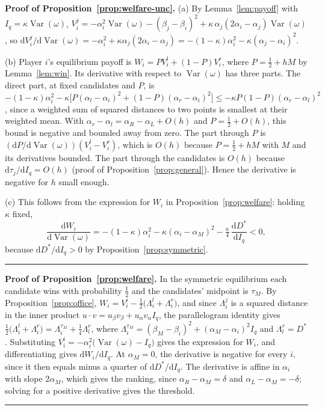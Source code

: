 \documentclass[12pt,letterpaper]{article}
\newenvironment{proof}[1][Proof]{\noindent\textbf{#1.} }{\ \rule{0.5em}{0.5em}}
\begin{document}
\begin{proof}[Proof of Proposition~\ref{prop:welfare-unc}]
(a) By Lemma~\ref{lem:payoff} with $I_q=\kappa\operatorname{Var}(\omega)$, $V_i^j=-\alpha_i^2\operatorname{Var}(\omega)-(\beta_j-\beta_i)^2+\kappa\,\alpha_j(2\alpha_i-\alpha_j)\operatorname{Var}(\omega)$, so $\mathrm{d}V_i^j/\mathrm{d}\operatorname{Var}(\omega)=-\alpha_i^2+\kappa\alpha_j(2\alpha_i-\alpha_j)=-(1-\kappa)\alpha_i^2-\kappa(\alpha_j-\alpha_i)^2$.

(b) Player $i$'s equilibrium payoff is $W_i=PV_i^l+(1-P)V_i^r$, where $P=\tfrac12+hM$ by Lemma~\ref{lem:win}. Its derivative with respect to $\operatorname{Var}(\omega)$ has three parts. The direct part, at fixed candidates and $P$, is $-(1-\kappa)\alpha_i^2-\kappa\big[P(\alpha_l-\alpha_i)^2+(1-P)(\alpha_r-\alpha_i)^2\big]\le-\kappa P(1-P)(\alpha_r-\alpha_l)^2$, since a weighted sum of squared distances to two points is smallest at their weighted mean. With $\alpha_r-\alpha_l=\alpha_R-\alpha_L+O(h)$ and $P=\tfrac12+O(h)$, this bound is negative and bounded away from zero. The part through $P$ is $(\mathrm{d}P/\mathrm{d}\operatorname{Var}(\omega))(V_i^l-V_i^r)$, which is $O(h)$ because $P=\tfrac12+hM$ with $M$ and its derivatives bounded. The part through the candidates is $O(h)$ because $\mathrm{d}\tau_j/\mathrm{d}I_q=O(h)$ (proof of Proposition~\ref{prop:general}). Hence the derivative is negative for $h$ small enough.

(c) This follows from the expression for $W_i$ in Proposition~\ref{prop:welfare}: holding $\kappa$ fixed,
\[
\frac{\mathrm{d}W_i}{\mathrm{d}\operatorname{Var}(\omega)}=-(1-\kappa)\alpha_i^2-\kappa(\alpha_i-\alpha_M)^2-\tfrac{\kappa}{4}\,\frac{\mathrm{d}D^*}{\mathrm{d}I_q}<0,
\]
because $\mathrm{d}D^*/\mathrm{d}I_q>0$ by Proposition~\ref{prop:symmetric}.
\end{proof}

\begin{proof}[Proof of Proposition~\ref{prop:welfare}]
In the symmetric equilibrium each candidate wins with probability $\tfrac12$ and the candidates' midpoint is $\tau_M$. By Proposition~\ref{prop:office}, $W_i=V_i^i-\tfrac12\big(\Lambda_i^l+\Lambda_i^r\big)$, and since $\Lambda_i^j$ is a squared distance in the inner product $u\cdot v=u_\beta v_\beta+u_\alpha v_\alpha I_q$, the parallelogram identity gives $\tfrac12\big(\Lambda_i^l+\Lambda_i^r\big)=\Lambda_i^{\tau_M}+\tfrac14\Lambda_l^r$, where $\Lambda_i^{\tau_M}=(\beta_M-\beta_i)^2+(\alpha_M-\alpha_i)^2I_q$ and $\Lambda_l^r=D^*$. Substituting $V_i^i=-\alpha_i^2\big(\operatorname{Var}(\omega)-I_q\big)$ gives the expression for $W_i$, and differentiating gives $\mathrm{d}W_i/\mathrm{d}I_q$. At $\alpha_M=0$, the derivative is negative for every $i$, since it then equals minus a quarter of $\mathrm{d}D^*/\mathrm{d}I_q$. The derivative is affine in $\alpha_i$ with slope $2\alpha_M$, which gives the ranking, since $\alpha_R-\alpha_M=\delta$ and $\alpha_L-\alpha_M=-\delta$; solving for a positive derivative gives the threshold.
\end{proof}
\end{document}
